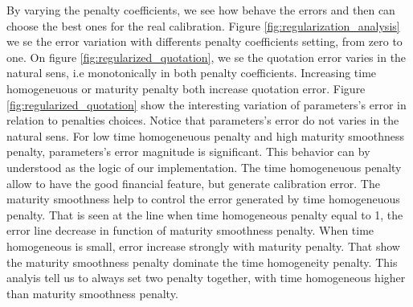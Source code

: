 \documentclass[a4paper,10pt]{article}
\begin{document}
By varying the penalty coefficients, we see how behave the errors and then can choose the best ones for the real calibration. Figure \ref{fig:regularization_analysis} we se the error variation with differents penalty coefficients setting, from zero to one. On figure \ref{fig:regularized_quotation}, we se the quotation error varies in the natural sens, i.e monotonically in both penalty coefficients. Increasing time homogeneuous or maturity penalty both increase quotation error. Figure \ref{fig:regularized_quotation} show the interesting variation of parameters's error in relation to penalties choices. Notice that parameters's error do not varies in the natural sens. For low time homogeneuous penalty and high maturity smoothness penalty, parameters's error magnitude is significant. This behavior can by understood as the logic of our implementation. The time homogeneuous penalty allow to have the good financial feature, but generate calibration error. The maturity smoothness help to control the error generated by time homogeneuous penalty. That is seen at the line when time homogeneous penalty equal to 1, the error line decrease in function of maturity smoothness penalty. When time homogeneous is small, error increase strongly with maturity penalty. That show the maturity smoothness penalty dominate the time homogeneity penalty. This analyis tell us to always set two penalty together, with time homogeneous higher than maturity smoothness penalty.
\end{document}
